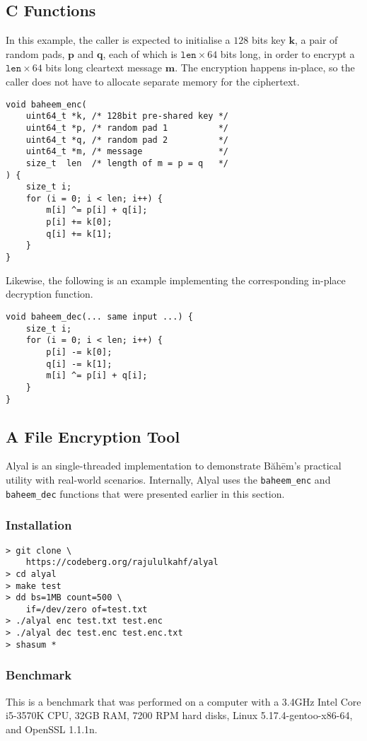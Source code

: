 \documentclass[twocolumn,hidelinks]{article}
\newcommand{\baheem}{Băhēm}
\begin{document}
\subsection{C Functions}
In this example, the caller is expected to initialise a $128$ bits key
$\mathbf{k}$, a pair of random pads, $\mathbf{p}$ and $\mathbf{q}$, each of
which is $\mathtt{len} \times 64$ bits long, in order to encrypt a
$\mathtt{len} \times 64$ bits long cleartext message $\mathbf{m}$.  The
encryption happens in-place, so the caller does not have to allocate
separate memory for the ciphertext.
\begin{verbatim}
void baheem_enc(
    uint64_t *k, /* 128bit pre-shared key */
    uint64_t *p, /* random pad 1          */
    uint64_t *q, /* random pad 2          */
    uint64_t *m, /* message               */
    size_t  len  /* length of m = p = q   */
) {
    size_t i;
    for (i = 0; i < len; i++) {
        m[i] ^= p[i] + q[i];
        p[i] += k[0];
        q[i] += k[1];
    }
}
\end{verbatim}
Likewise, the following is an example implementing the corresponding
in-place decryption function.
\begin{verbatim}
void baheem_dec(... same input ...) {
    size_t i;
    for (i = 0; i < len; i++) {
        p[i] -= k[0];
        q[i] -= k[1];
        m[i] ^= p[i] + q[i];
    }
}
\end{verbatim}


\subsection{A File Encryption Tool}
Alyal is an single-threaded implementation to demonstrate \baheem's
practical utility with real-world scenarios.  Internally, Alyal uses the
\texttt{baheem\_enc} and \texttt{baheem\_dec} functions that were presented
earlier in this section.

\subsubsection{Installation}
\begin{verbatim}
> git clone \
    https://codeberg.org/rajululkahf/alyal
> cd alyal
> make test
> dd bs=1MB count=500 \
    if=/dev/zero of=test.txt
> ./alyal enc test.txt test.enc
> ./alyal dec test.enc test.enc.txt
> shasum *
\end{verbatim}

\subsubsection{Benchmark}
This is a benchmark that was performed on a computer with a 3.4GHz Intel
Core i5-3570K CPU, 32GB RAM, 7200 RPM hard disks, Linux
5.17.4-gentoo-x86-64, and OpenSSL 1.1.1n.
\end{document}

